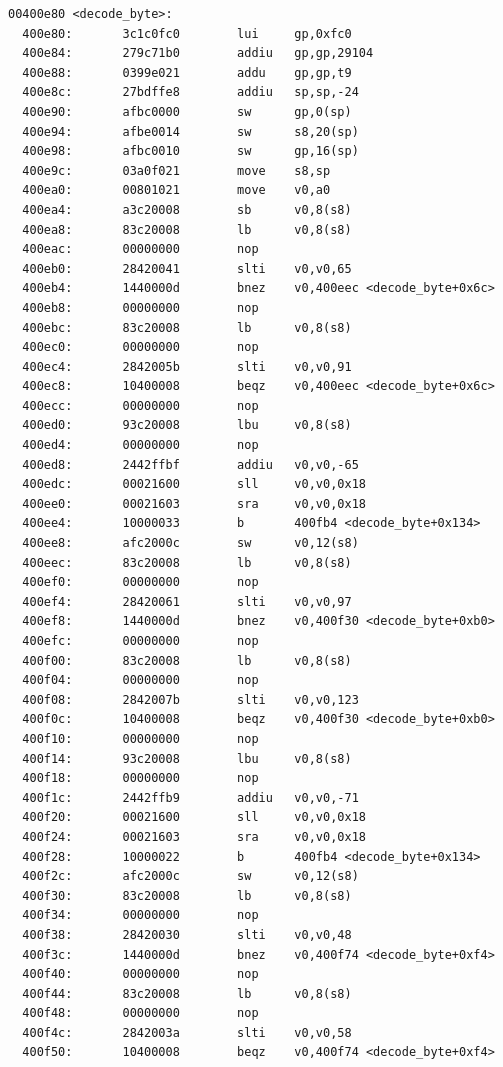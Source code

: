 \documentclass[11pt]{article}
\begin{document}
\begin{verbatim}
00400e80 <decode_byte>:
  400e80:       3c1c0fc0        lui     gp,0xfc0
  400e84:       279c71b0        addiu   gp,gp,29104
  400e88:       0399e021        addu    gp,gp,t9
  400e8c:       27bdffe8        addiu   sp,sp,-24
  400e90:       afbc0000        sw      gp,0(sp)
  400e94:       afbe0014        sw      s8,20(sp)
  400e98:       afbc0010        sw      gp,16(sp)
  400e9c:       03a0f021        move    s8,sp
  400ea0:       00801021        move    v0,a0
  400ea4:       a3c20008        sb      v0,8(s8)
  400ea8:       83c20008        lb      v0,8(s8)
  400eac:       00000000        nop
  400eb0:       28420041        slti    v0,v0,65
  400eb4:       1440000d        bnez    v0,400eec <decode_byte+0x6c>
  400eb8:       00000000        nop
  400ebc:       83c20008        lb      v0,8(s8)
  400ec0:       00000000        nop
  400ec4:       2842005b        slti    v0,v0,91
  400ec8:       10400008        beqz    v0,400eec <decode_byte+0x6c>
  400ecc:       00000000        nop
  400ed0:       93c20008        lbu     v0,8(s8)
  400ed4:       00000000        nop
  400ed8:       2442ffbf        addiu   v0,v0,-65
  400edc:       00021600        sll     v0,v0,0x18
  400ee0:       00021603        sra     v0,v0,0x18
  400ee4:       10000033        b       400fb4 <decode_byte+0x134>
  400ee8:       afc2000c        sw      v0,12(s8)
  400eec:       83c20008        lb      v0,8(s8)
  400ef0:       00000000        nop
  400ef4:       28420061        slti    v0,v0,97
  400ef8:       1440000d        bnez    v0,400f30 <decode_byte+0xb0>
  400efc:       00000000        nop
  400f00:       83c20008        lb      v0,8(s8)
  400f04:       00000000        nop
  400f08:       2842007b        slti    v0,v0,123
  400f0c:       10400008        beqz    v0,400f30 <decode_byte+0xb0>
  400f10:       00000000        nop
  400f14:       93c20008        lbu     v0,8(s8)
  400f18:       00000000        nop
  400f1c:       2442ffb9        addiu   v0,v0,-71
  400f20:       00021600        sll     v0,v0,0x18
  400f24:       00021603        sra     v0,v0,0x18
  400f28:       10000022        b       400fb4 <decode_byte+0x134>
  400f2c:       afc2000c        sw      v0,12(s8)
  400f30:       83c20008        lb      v0,8(s8)
  400f34:       00000000        nop
  400f38:       28420030        slti    v0,v0,48
  400f3c:       1440000d        bnez    v0,400f74 <decode_byte+0xf4>
  400f40:       00000000        nop
  400f44:       83c20008        lb      v0,8(s8)
  400f48:       00000000        nop
  400f4c:       2842003a        slti    v0,v0,58
  400f50:       10400008        beqz    v0,400f74 <decode_byte+0xf4>

\end{verbatim}
\end{document}
